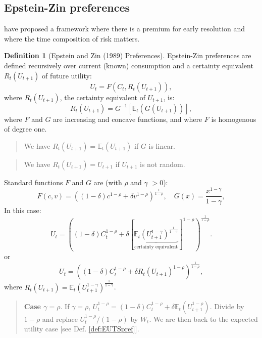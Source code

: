 \documentclass[
  12pt,
]{book}
\theoremstyle{definition}
\newtheorem{definition}{Definition}[chapter]
\theoremstyle{definition}
\theoremstyle{definition}
\theoremstyle{definition}
\theoremstyle{remark}
\begin{document}
\hypertarget{EZsection}{%
\subsection{Epstein-Zin preferences}\label{EZsection}}

\citet{Epstein_Zin_1989} have proposed a framework where there is a premium for early resolution and where the time composition of risk matters.

\begin{definition}[Epstein and Zin (1989) Preferences]
\protect\hypertarget{def:EZ}{}\label{def:EZ}Epstein-Zin preferences are defined recursively over current (known) consumption and a certainty equivalent
\(R_t(U_{t+1})\) of future utility:
\[
U_{t} = F(C_t,R_t(U_{t+1})),
\]
where \(R_t(U_{t+1})\), the certainty equivalent of \(U_{t+1}\), is:
\[
R_t(U_{t+1}) = G^{-1}[\mathbb{E}_t(G(U_{t+1}))],
\]
where \(F\) and \(G\) are increasing and concave functions, and where \(F\) is homogenous of degree one.
\end{definition}

\begin{quote}
We have \(R_t(U_{t+1})=\mathbb{E}_t(U_{t+1})\) if \(G\) is linear.
\end{quote}

\begin{quote}
We have \(R_t(U_{t+1})=U_{t+1}\) if \(U_{t+1}\) is not random.
\end{quote}

Standard functions \(F\) and \(G\) are (with \(\rho\) and \(\gamma\) \(>0\)):
\[
F(c,v) = \left((1-\delta)c^{1-\rho} + \delta v^{1-\rho}\right)^{\frac{1}{1-\rho}}, \quad G(x)=\frac{x^{1-\gamma}}{1-\gamma},
\]
In this case:
\begin{equation}
\boxed{ U_t = \left((1-\delta)C_t^{1-\rho}+\delta \left[\underbrace{ \mathbb{E}_t\left(U_{t+1}^{1-\gamma}\right)^{\frac{1}{1-\gamma}} }_{\mbox{certainty equivalent}}\right] ^{1-\rho}\right)^{\frac{1}{1-\rho}}.}\label{eq:EZpreferences}
\end{equation}
or
\begin{equation}
U_t = \left((1-\delta)C_t^{1-\rho} + \delta R_t(U_{t+1})^{1-\rho}\right)^{\frac{1}{1-\rho}},\label{eq:EZpreferences2}
\end{equation}
where \(R_t(U_{t+1})=\mathbb{E}_t(U_{t+1}^{1-\gamma})^{\frac{1}{1-\gamma}}\).

\begin{quote}
\textbf{Case \(\gamma = \rho\)}. If \(\gamma = \rho\), \(U_t^{1-\rho}=(1-\delta)C_t^{1-\rho} + \delta \mathbb{E}_t(U_{t+1}^{1-\rho})\).
Divide by \(1-\rho\) and replace \(U_t^{1-\rho}/(1-\rho)\) by \(W_t\). We are then back to the expected utility case {[}see Def. \ref{def:EUTSpref}{]}.
\end{quote}
\end{document}
